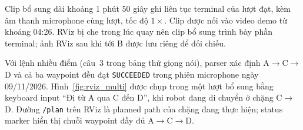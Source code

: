 Clip bổ sung dài khoảng 1 phút 50 giây ghi liên tục terminal của lượt
đạt, kèm âm thanh microphone cùng lượt, tốc độ $1\times$.
Clip được nối vào video demo từ khoảng 04:26. RViz bị che trong lúc
quay nên clip bổ sung trình bày phần terminal; ảnh RViz sau khi tới B
được lưu riêng để đối chiếu.

Với lệnh nhiều điểm (câu~3 trong bảng thử giọng nói), parser xác định
A$\to$C$\to$D và cả ba waypoint đều đạt \texttt{SUCCEEDED} trong
phiên microphone ngày 09/11/2026. Hình~\ref{fig:rviz_multi} được chụp
trong một lượt bổ sung bằng keyboard input ``Đi từ A qua C đến D'',
khi robot đang di chuyển ở chặng C$\to$D. Đường \texttt{/plan} trên
RViz là planned path của chặng đang thực hiện; status marker hiển thị
chuỗi waypoint đầy đủ A$\to$C$\to$D.
